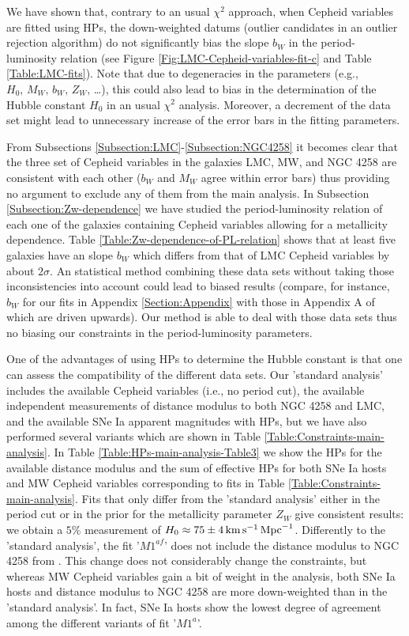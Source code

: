 We have shown that, contrary to an usual $\chi^2$ approach, when Cepheid variables are fitted using HPs, the down-weighted datums (outlier candidates in an outlier rejection algorithm) do not significantly bias the slope $b_W$ in the period-luminosity relation (see Figure \ref{Fig:LMC-Cepheid-variables-fit-c} and Table \ref{Table:LMC-fits}). Note that due to degeneracies in the parameters (e.g., $H_0,\, M_W,\, b_W,\, Z_W,\,$\dots), this could also lead to bias in the determination of the Hubble constant $H_0$ in an usual $\chi^2$ analysis. Moreover, a decrement of the data set might lead to unnecessary increase of the error bars in the fitting parameters.

From Subsections \ref{Subsection:LMC}-\ref{Subsection:NGC4258} it becomes clear that the three set of Cepheid variables in the galaxies LMC, MW, and NGC 4258 are consistent with each other ($b_W$ and $M_W$ agree within error bars) thus providing no argument to exclude any of them from the main analysis. In Subsection \ref{Subsection:Zw-dependence} we have studied the period-luminosity relation of each one of the galaxies containing Cepheid variables allowing for a metallicity dependence. Table \ref{Table:Zw-dependence-of-PL-relation} shows that at least five galaxies have an slope $b_W$ which differs from that of LMC Cepheid variables by about $2\sigma$. An statistical method combining these data sets without taking those inconsistencies into account could lead to biased results (compare, for instance, $b_W$ for our fits in Appendix \ref{Section:Appendix} with those in Appendix A of \cite{Efstathiou:2013via} which are driven upwards). Our method is able to deal with those data sets thus no biasing our constraints in the period-luminosity parameters.

One of the advantages of using HPs to determine the Hubble constant is that one can assess the compatibility of the different data sets. Our 'standard analysis' includes the available Cepheid variables (i.e., no period cut), the available independent measurements of distance modulus to both NGC 4258 and LMC, and the available SNe Ia apparent magnitudes with HPs, but we have also performed several variants which are shown in Table \ref{Table:Constraints-main-analysis}. In Table \ref{Table:HPs-main-analysis-Table3} we show the HPs for the available distance modulus and the sum of effective HPs for both SNe Ia hosts and MW Cepheid variables corresponding to fits in Table \ref{Table:Constraints-main-analysis}. Fits that only differ from the 'standard analysis' either in the period cut or in the prior for the metallicity parameter $Z_W$ give consistent results: we obtain a $5\%$ measurement of $H_0 \approx 75 \pm 4\, \mathrm{km}\, \mathrm{s}^{-1}\, \mathrm{Mpc}^{-1}$. Differently to the 'standard analysis', the fit '$M1^{af}$' does not include the distance modulus to NGC 4258 from \cite{Polshaw:2015ika}. This change does not considerably change the constraints, but whereas MW Cepheid variables gain a bit of weight in the analysis, both SNe Ia hosts and distance modulus to NGC 4258 are more down-weighted than in the 'standard analysis'. In fact, SNe Ia hosts show the lowest degree of agreement among the different variants of fit '$M1^a$'.

